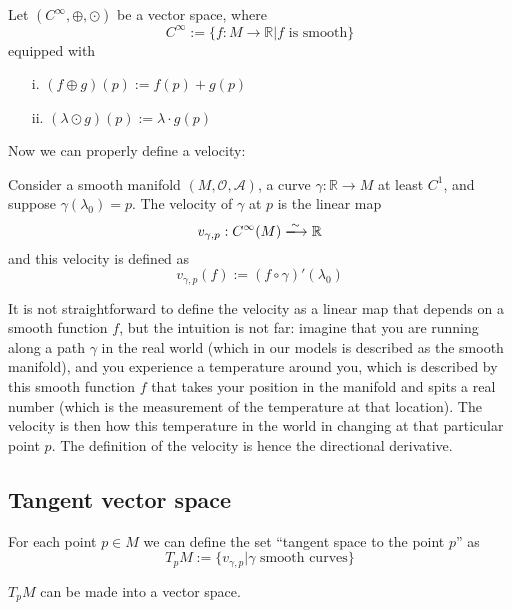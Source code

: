 \begin{definition}
    Let $(C^{\infty}, \oplus, \odot)$ be a vector space, where 
    \[
        C^\infty := \{f:M\longrightarrow \mathbb{R} | \text{$f$ is smooth}\}
    \]
    equipped with
    \begin{itemize}
        \item[i.] $(f \oplus g)(p) := f(p) + g(p)$
        \item[ii.] $(\lambda \odot g)(p) := \lambda \cdot g(p)$
    \end{itemize}
\end{definition}

Now we can properly define a velocity:

\begin{definition}[Velocity]
    Consider a smooth manifold $(M, \mathcal{O}, \mathcal{A})$, a curve $\gamma : \mathbb{R} \longrightarrow M$ at least $C^1$, and suppose $\gamma(\lambda_0) = p$.
    The velocity of $\gamma$ at $p$ is the linear map
    \[
        v_{\gamma, p} : C^\infty(M) \xlongrightarrow[]{\sim} \mathbb{R}
    \]
    and this velocity is defined as
    \[
        v_{\gamma, p}(f) := (f \circ \gamma)'(\lambda_0)
    \]
\end{definition}

It is not straightforward to define the velocity as a linear map that depends on a smooth function $f$, but the intuition is not far: imagine that you are running along a path $\gamma$ in the real world (which in our models is described as the smooth manifold), and you experience a temperature around you, which is described by this smooth function $f$ that takes your position in the manifold and spits a real number (which is the measurement of the temperature at that location). The velocity is then how this temperature in the world in changing at that particular point $p$. The definition of the velocity is hence the directional derivative.

\subsection{Tangent vector space}

\begin{definition}
    For each point $p \in M$ we can define the set ``tangent space to the point $p$'' as
    \[
        T_pM := \{v_{\gamma, p} | \text{$\gamma$ smooth curves}\}
    \]
\end{definition}

\begin{remark}
    $T_pM$ can be made into a vector space.
\end{remark}


